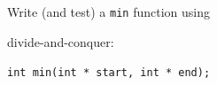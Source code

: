 Write (and test) a \texttt{min} function using

divide-and-conquer:



\verb!int min(int * start, int * end);!

